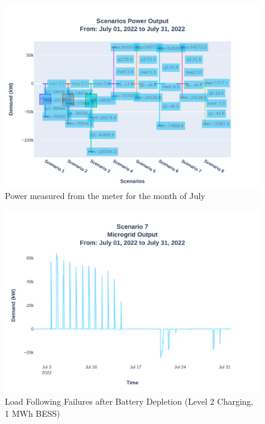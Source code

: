 \documentclass[conference]{IEEEtran}
\begin{document}
	\begin{figure}[H]
		\centering
		\includegraphics[width=1\linewidth]{Fig/Option_3/4_Scn_Output_Run_3_Jul_01_2022_to_Jul_31_2022}
		\caption{\footnotesize  Power measured from the meter for the month of July}
		\label{fig:4scnoutputrun2jul012022tojul312022}
	\end{figure}
	\begin{figure}[H]
	\centering
	\includegraphics[width=\linewidth]{Fig/Option_3/4_Scenario_7_Run_3_Mg_Output_Jul_01_2022_to_Jul_31_2022.pdf}
	\caption{\footnotesize Load Following Failures after Battery Depletion (Level 2 Charging, 1 MWh BESS)}
	\label{fig:scenario3peakshaving}
\end{figure}
\end{document}
